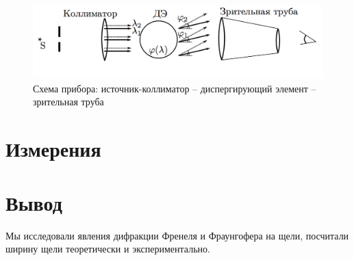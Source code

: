 \documentclass{letask}
\begin{document}
\begin{figure}[H]
\centering
	\includegraphics[width = \lw]{scheme}
	\caption{Схема прибора: источник-коллиматор -- диспергирующий элемент -- зрительная труба}
	\label{fig:scheme}
\end{figure}

\section{Измерения}



\section{Вывод}
Мы исследовали явления дифракции Френеля и Фраунгофера на щели, посчитали ширину щели теоретически и экспериментально.
\end{document}
